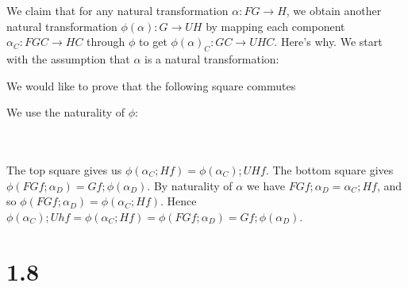 \documentclass{article}
\begin{document}
We claim that for any natural transformation $\alpha : FG \to H$, we obtain another natural transformation
$\phi(\alpha) : G \to UH$ by mapping each component $\alpha_C : FGC \to HC$ through $\phi$ to get 
$\phi(\alpha)_C : GC \to UHC$. Here's why. We start with the assumption that $\alpha$ is a natural transformation:

\begin{center}
\end{center}

We would like to prove that the following square commutes

\begin{center}
\end{center}

We use the naturality of $\phi$:

~\\~\\
The top square gives us $\phi(\alpha_C;Hf) = \phi(\alpha_C);UHf$. The bottom square gives
$\phi(FGf;\alpha_D) = Gf;\phi(\alpha_D)$. By naturality of $\alpha$ we have $FGf;\alpha_D = \alpha_C;Hf$, and so
$\phi(FGf;\alpha_D) = \phi(\alpha_C;Hf)$. Hence $\phi(\alpha_C);Uhf = \phi(\alpha_C;Hf) = \phi(FGf;\alpha_D) = Gf;\phi(\alpha_D)$.

\section*{1.8}
\end{document}
